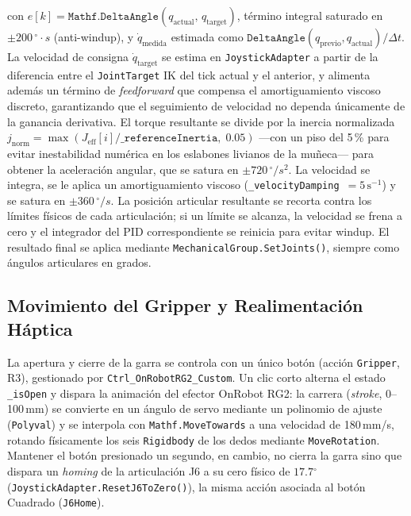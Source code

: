 \documentclass[12pt]{article}
\begin{document}
con $e[k] = \texttt{Mathf.DeltaAngle}(q_{\text{actual}},\, q_{\text{target}})$, término integral saturado en $\pm 200\,{^\circ}{\cdot}s$ (anti-windup), y $\dot{q}_{\text{medida}}$ estimada como $\texttt{DeltaAngle}(q_{\text{previo}}, q_{\text{actual}})/\Delta t$. La velocidad de consigna $\dot{q}_{\text{target}}$ se estima en \texttt{JoystickAdapter} a partir de la diferencia entre el \texttt{JointTarget} IK del tick actual y el anterior, y alimenta además un término de \textit{feedforward} que compensa el amortiguamiento viscoso discreto, garantizando que el seguimiento de velocidad no dependa únicamente de la ganancia derivativa. El torque resultante se divide por la inercia normalizada $j_{\text{norm}} = \max(J_{\text{eff}}[i] / \texttt{\_referenceInertia},\; 0.05)$ ---con un piso del 5\,\% para evitar inestabilidad numérica en los eslabones livianos de la muñeca--- para obtener la aceleración angular, que se satura en $\pm 720\,{^\circ}/s^2$. La velocidad se integra, se le aplica un amortiguamiento viscoso (\texttt{\_velocityDamping}~$= 5\,\mathrm{s^{-1}}$) y se satura en $\pm 360\,{^\circ}/s$. La posición articular resultante se recorta contra los límites físicos de cada articulación; si un límite se alcanza, la velocidad se frena a cero y el integrador del PID correspondiente se reinicia para evitar windup. El resultado final se aplica mediante \texttt{MechanicalGroup.SetJoints()}, siempre como ángulos articulares en grados.

\subsection{Movimiento del Gripper y Realimentación Háptica}

La apertura y cierre de la garra se controla con un único botón (acción \texttt{Gripper}, R3), gestionado por \texttt{Ctrl\_OnRobotRG2\_Custom}. Un clic corto alterna el estado \texttt{\_isOpen} y dispara la animación del efector OnRobot RG2: la carrera (\textit{stroke}, 0--100\,mm) se convierte en un ángulo de servo mediante un polinomio de ajuste (\texttt{Polyval}) y se interpola con \texttt{Mathf.MoveTowards} a una velocidad de 180\,mm/s, rotando físicamente los seis \texttt{Rigidbody} de los dedos mediante \texttt{MoveRotation}. Mantener el botón presionado un segundo, en cambio, no cierra la garra sino que dispara un \textit{homing} de la articulación J6 a su cero físico de $17.7{^\circ}$ (\texttt{JoystickAdapter.ResetJ6ToZero()}), la misma acción asociada al botón Cuadrado (\texttt{J6Home}).
\end{document}
